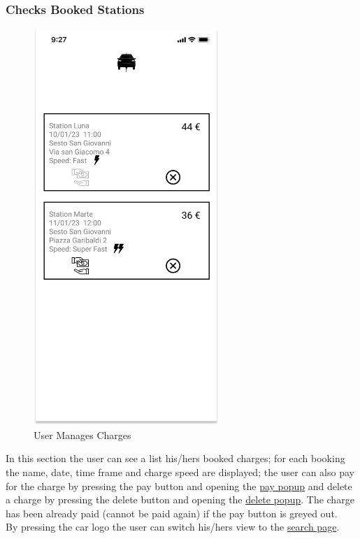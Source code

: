 \subsubsection{Checks Booked Stations}
\begin{figure}[H]
    \centering
    \includegraphics[keepaspectratio, height=15cm]{Mockup/UserAppInterface/My Charges.png}
    \caption{User Manages Charges}
    \label{fig:myCharges}
\end{figure}
In this section the user can see a list his/hers booked charges; for each booking the name, date, time frame and charge speed are displayed; the user can also pay for the charge by pressing the pay button and opening the \hyperref[pop:Pay]{pay popup} and delete a charge by pressing the delete button and opening the \hyperref[pop:Delete]{delete popup}. The charge has been already paid (cannot be paid again) if the pay button is greyed out.\\
By pressing the car logo the user can switch his/hers view to the \hyperref[fig:Search]{search page}.
